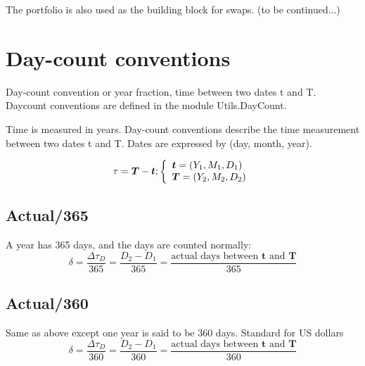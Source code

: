 \documentclass[11pt,a4paper]{article}
\numberwithin{equation}{section}
\begin{document}
	The portfolio is also used as the building block for swaps. (to be continued...)


	\section{Day-count conventions}

	Day-count convention or year fraction, time between two dates t and T. Daycount conventions are defined in the module Utils.DayCount.



	Time is measured in years. Day-count conventions describe the time measurement between two
	dates t and T. Dates are expressed by (day, month, year).

	\[ \tau = \boldsymbol{T} - \boldsymbol{t};  \left\{
	  \begin{array}{l l}
		  \boldsymbol{t} = (Y_1, M_1, D_1) \\
	\boldsymbol{T}=(Y_2,M_2,D_2)
	  \end{array} \right.\]


	\subsection{Actual/365}
	A year has 365 days, and the days are counted normally:
	\[
	\delta = \frac{\Delta \tau_D}{365} = \frac{D_2-D_1}{365} = \frac{\text{actual days between } \boldsymbol{t} \text{ and } \boldsymbol{T}}{365}
	\]


	\subsection{Actual/360}
	Same as above except one year is said to be 360 days. Standard for US dollars
	\[
	\delta = \frac{\Delta \tau_D}{360} =\frac{D_2-D_1}{360} = \frac{\text{actual days between } \boldsymbol{t} \text{ and } \boldsymbol{T}}{360}
	\]
\end{document}
